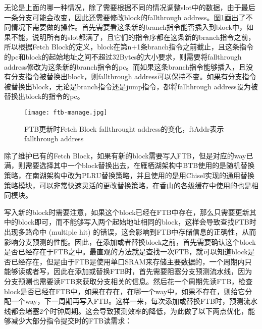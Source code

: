 
无论是上面的哪一种情况，除了需要根据不同的情况调整slot中的数据，由于最后一条分支可能会改变，因此还需要修改block的fallthrough address。图\ref{fig:figure32}画出了不同情况下需要做的操作。首先需要看这条新的branch指令能否插入到block中，如果不能，说明所有的slot都满了，且它们的指令序都在这条新的branch指令之前，所以根据Fetch Block的定义，block在第n+1条branch指令之前截止，且这条指令的pc和block的起始地址之间不超过32Bytes的大小要求，则需要将fallthrough address修改为这条新的branch指令的pc。而如果这条branch指令能够插入，且没有分支指令被替换出block，则fallthrough address可以保持不变。如果有分支指令被替换出block，无论是branch指令还是jump指令，都将fallthrough address设为被替换出block的指令的pc。

\begin{figure}[htb]
	\centering
	\setlength\tabcolsep{3pt}  %
	\vspace{5pt} %
	\texttt{[image: ftb-manage.jpg]}
	\caption{FTB更新时Fetch Block fallthrought address的变化，ftAddr表示fallthrough address}
	\label{fig:figure32}
\end{figure}

除了维护已有的Fetch Block，如果有新的block需要写入FTB，但是对应的way已满，则需要选择其中一个block替换出去，在雁栖湖架构中BTB使用的是随机替换策略，在南湖架构中改为PLRU替换策略，并且使用的是用Chisel实现的通用替换策略模块，可以非常快速灵活的更改替换策略，在香山的各级缓存中使用的也是相同模块。

写入新的block时需要注意，如果这个block已经在FTB中存在，那么只需要更新其中的block即可，而不能够写入两个起始地址相同的block，这样会导致查找FTB时出现多路命中 (multiple hit) 的错误，这会影响到FTB中存储信息的正确性，从而影响分支预测的性能。因此，在添加或者替换block之前，首先需要确认这个block是否已经存在于FTB之中。最直观的方法就是查找一次FTB，就可以知道block是否已经存在，但是由于FTB是使用单口SRAM来存储主要数据的，一个周期内只能够读或者写，因此在添加或替换FTB时，首先需要阻塞分支预测流水线，因为分支预测也需要读FTB来获取分支相关的信息。然后花一个周期先读FTB，检查block是否已经在FTB中，如果在存在，在哪一个way中，如果不存在，则给它分配一个way，下一周期再写入FTB。这样一来，每次添加或替换FTB时，预测流水线都会堵塞2个时钟周期。这会导致预测效率的降低，为此做了以下两点优化，能够减少大部分指令提交时的FTB读需求：

